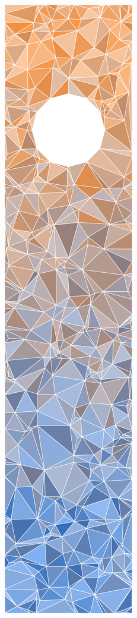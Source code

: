 \documentclass[a4paper,11pt]{article}
\begin{document}
\noindent
\begin{minipage}[t]{0.3106\textwidth}
    \clearpage  %
    \vspace{-0.45cm}
    \includegraphics[width=\textwidth]{triangles.pdf}


\end{minipage}
\end{document}
